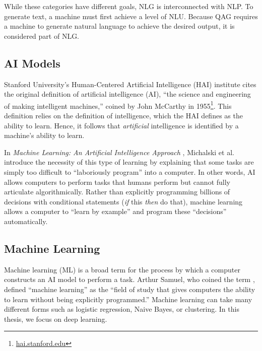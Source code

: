 While these categories have different goals, NLG is interconnected with NLP. To generate text, a machine must first achieve a level of NLU. Because QAG requires a machine to generate natural language to achieve the desired output, it is considered part of NLG.

\subsection{AI Models}
Stanford University's Human-Centered Artificial Intelligence (HAI) institute cites the original definition of artificial intelligence (AI), ``the science and engineering of making intelligent machines,'' coined by John McCarthy in 1955\footnote{\href{https://hai.stanford.edu/sites/default/files/2020-09/AI-Definitions-HAI.pdf}{hai.stanford.edu}}. This definition relies on the definition of intelligence, which the HAI defines as the ability to learn. Hence, it follows that \textit{artificial} intelligence is identified by a machine's ability to learn.

In \textit{Machine Learning: An Artificial Intelligence Approach} \cite{michalski2014}, Michalski et al. introduce the necessity of this type of learning by explaining that some tasks are simply too difficult to ``laboriously program'' into a computer. In other words, AI allows computers to perform tasks that humans perform but cannot fully articulate algorithmically. Rather than explicitly programming billions of decisions with conditional statements (\textit{if} this \textit{then} do that), machine learning allows a computer to ``learn by example'' and program these ``decisions'' automatically.

\subsection{Machine Learning}
Machine learning (ML) is a broad term for the process by which a computer constructs an AI model to perform a task. Arthur Samuel, who coined the term \cite{zhou2021}, defined ``machine learning'' as the ``field of study that gives computers the ability to learn without being explicitly programmed.'' Machine learning can take many different forms such as logistic regression, Naive Bayes, or clustering. In this thesis, we focus on deep learning.

